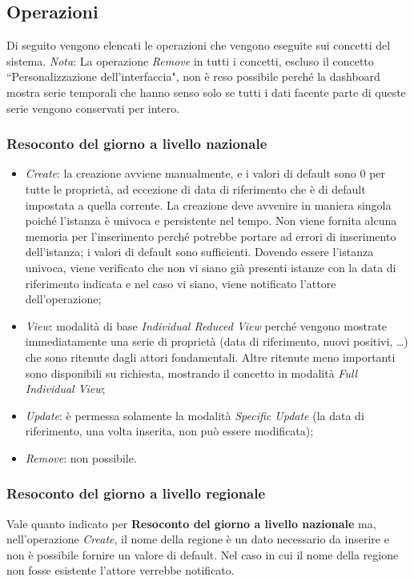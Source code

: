 \subsection{Operazioni}
\label{ss:operazioni}
Di seguito vengono elencati le operazioni che vengono eseguite sui concetti del sistema.
\noindent
\textit{Nota}: La operazione \textit{Remove} in tutti i concetti, escluso il concetto ``Personalizzazione dell'interfaccia", non è reso possibile perché la dashboard mostra serie temporali che hanno senso solo se tutti i dati facente parte di queste serie vengono conservati per intero.

\subsubsection{Resoconto del giorno a livello nazionale}
\label{sss:operazioni-resoconto-del-giorno-livello-nazionale}
\begin{itemize}
    \item \textit{Create}: la creazione avviene manualmente, e i valori di default sono 0 per tutte le proprietà, ad eccezione di data di riferimento che è di default impostata a quella corrente.
    La creazione deve avvenire in maniera singola poiché l'istanza è univoca e persistente nel tempo.
    Non viene fornita alcuna memoria per l'inserimento perché potrebbe portare ad errori di inserimento dell'istanza; i valori di default sono sufficienti.
    Dovendo essere l'istanza univoca, viene verificato che non vi siano già presenti istanze con la data di riferimento indicata e nel caso vi siano, viene notificato l'attore dell'operazione;
    \item \textit{View}: modalità di base \textit{Individual Reduced View} perché vengono mostrate immediatamente una serie di proprietà (data di riferimento, nuovi positivi, \dots) che sono ritenute dagli attori fondamentali.
    Altre ritenute meno importanti sono disponibili su richiesta, mostrando il concetto in modalità \textit{Full Individual View};
    \item \textit{Update}: è permessa solamente la modalità \textit{Specific Update} (la data di riferimento, una volta inserita, non può essere modificata);
    \item \textit{Remove}: non possibile.
\end{itemize}

\subsubsection{Resoconto del giorno a livello regionale}
\label{sss:operazioni-resoconto-del-giorno-livello-regionale}
Vale quanto indicato per \textbf{Resoconto del giorno a livello nazionale} ma, nell'operazione \textit{Create}, il nome della regione è un dato necessario da inserire e non è possibile fornire un valore di default.
Nel caso in cui il nome della regione non fosse esistente l'attore verrebbe notificato.

